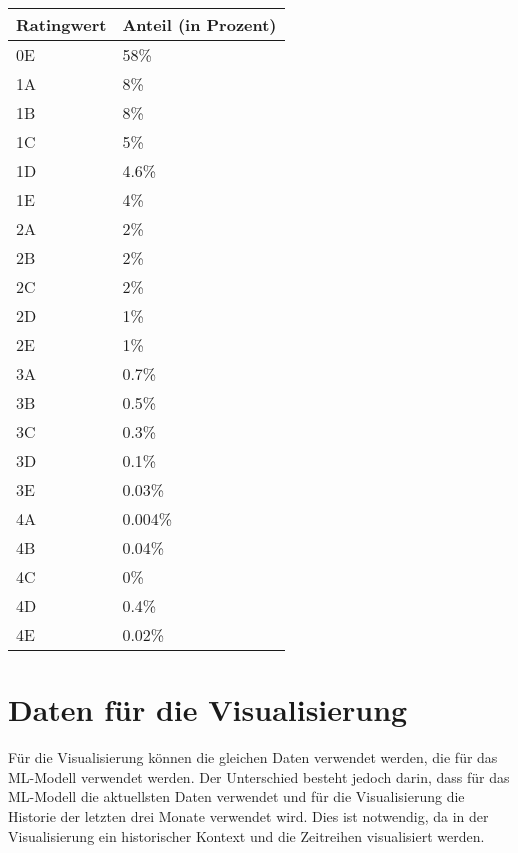 \begin{tabular}[h]{l|l}
Ratingwert & Anteil (in Prozent)   \\ \hline
0E & 58\% \\ \hline
1A & 8\% \\ \hline
1B & 8\% \\ \hline
1C & 5\% \\ \hline
1D & 4.6\% \\ \hline
1E & 4\% \\ \hline
2A & 2\% \\ \hline
2B & 2\% \\ \hline
2C & 2\% \\ \hline
2D & 1\% \\ \hline
2E & 1\% \\ \hline
3A & 0.7\% \\ \hline
3B & 0.5\% \\ \hline
3C & 0.3\% \\ \hline
3D & 0.1\% \\ \hline
3E & 0.03\% \\ \hline
4A & 0.004\% \\ \hline
4B & 0.04\% \\ \hline
4C & 0\% \\ \hline
4D & 0.4\% \\ \hline
4E & 0.02\% \\ 

\end{tabular}




\section{Daten für die Visualisierung}
Für die Visualisierung können die gleichen Daten verwendet werden, die für das ML-Modell verwendet werden.
Der Unterschied besteht jedoch darin, dass für das ML-Modell die aktuellsten Daten verwendet und für die Visualisierung die Historie der letzten drei Monate verwendet wird. 
Dies ist notwendig, da in der Visualisierung ein historischer Kontext und die Zeitreihen visualisiert werden. 







